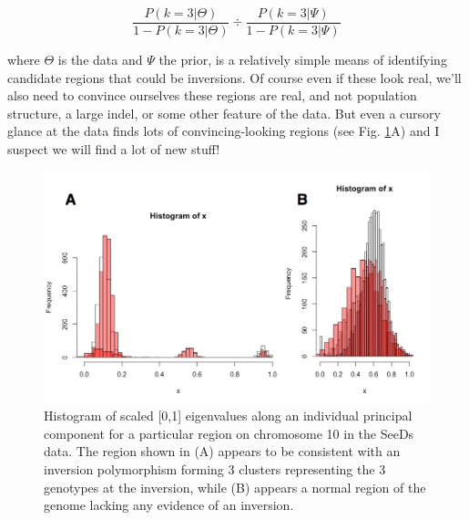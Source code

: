\documentclass[]{article}
\begin{document}
\begin{equation}
\frac{P(k=3|\Theta)}{1-P(k=3|\Theta)}\div \frac{P(k=3|\Psi)}{1-P(k=3|\Psi)}
\end{equation}

where $\Theta$ is the data and $\Psi$ the prior, is a relatively simple means of identifying candidate regions that could be inversions.  
Of course even if these look real, we'll also need to convince ourselves these regions are real, and not population structure, a large indel, or some other feature of the data. 
But even a cursory glance at the data finds lots of convincing-looking regions (see Fig. \ref{fig:dpp}A) and I suspect we will find a lot of new stuff!

\begin{figure}[h]   
  \begin{center}
   \includegraphics[width=0.7\linewidth]{dpp.png}
   \caption{
   Histogram of scaled [0,1] eigenvalues along an individual principal component for a particular region on chromosome 10 in the SeeDs data. The region shown in (A) appears to be consistent with an inversion polymorphism forming 3 clusters representing the 3 genotypes at the inversion, while (B) appears a normal region of the genome lacking any evidence of an inversion.} 
    \label{fig:dpp}
  \end{center}
\end{figure}
\end{document}
